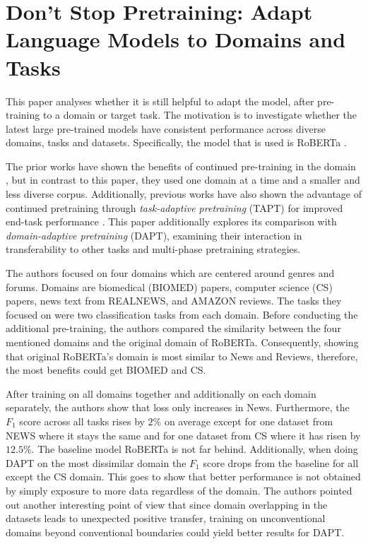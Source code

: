 \documentclass[times, utf8, seminar]{fer}
\begin{document}
\chapter{Don’t Stop Pretraining: Adapt Language Models to Domains and Tasks \citep{gururangan2020don}}
This paper analyses whether it is still helpful to adapt the model, after pre-training to a domain or target task. The motivation is to investigate whether the latest large pre-trained models have consistent performance across diverse domains, tasks and datasets. Specifically, the model that is used is RoBERTa \citep{liu2019roberta}.


The prior works have shown the benefits of continued pre-training in the domain \citep{lee2020biobert}, but in contrast to this paper, they used one domain at a time and a smaller and less diverse corpus. Additionally, previous works have also shown the advantage of continued pretraining through \emph{task-adaptive pretraining} (TAPT) for improved end-task performance \citep{howard2018universal, phang2018sentence}. This paper additionally explores its comparison with \emph{domain-adaptive pretraining} (DAPT), examining their interaction in transferability to other tasks and multi-phase pretraining strategies.


The authors focused on four domains which are centered around genres and forums. Domains are biomedical (BIOMED) papers, computer science (CS) papers, news text from REALNEWS, and AMAZON reviews. The tasks they focused on were two classification tasks from each domain. Before conducting the additional pre-training, the authors compared the similarity between the four mentioned domains and the original domain of RoBERTa. Consequently, showing that original RoBERTa's domain is most similar to News and Reviews, therefore, the most benefits could get BIOMED and CS.


After training on all domains together and additionally on each domain separately, the authors show that loss only increases in News. Furthermore, the \emph{$F_1$} score across all tasks rises by $2\%$ on average except for one dataset from NEWS where it stays the same and for one dataset from CS where it has risen by $12.5\%$. The baseline model RoBERTa is not far behind. Additionally, when doing DAPT on the most dissimilar domain the \emph{$F_1$} score drops from the baseline for all except the CS domain. This goes to show that better performance is not obtained by simply exposure to more data regardless of the domain. The authors pointed out another interesting point of view that since domain overlapping in the datasets leads to unexpected positive transfer, training on unconventional domains beyond conventional boundaries could yield better results for DAPT.
\end{document}
